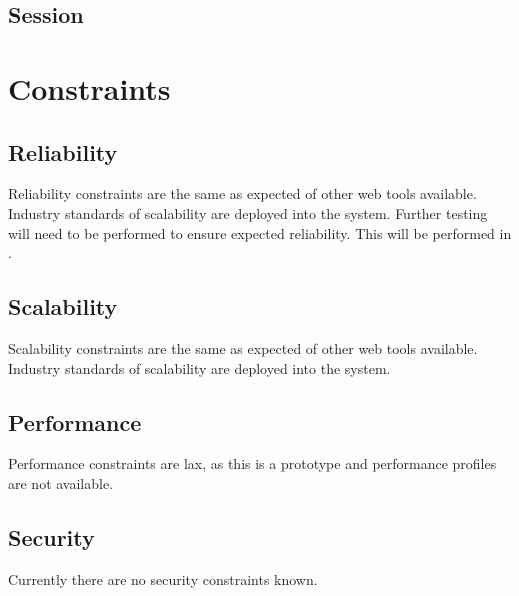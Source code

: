 \documentclass[11pt]{report}
\begin{document}
\subsection{Session}


\section{Constraints}

\subsection{Reliability}

Reliability constraints are the same as expected of other web tools available. Industry standards of scalability are deployed into the system. Further testing will need to be performed to ensure expected reliability. This will be performed in .  

\subsection{Scalability}

Scalability constraints are the same as expected of other web tools available. Industry standards of scalability are deployed into the system. 

\subsection{Performance}

Performance constraints are lax, as this is a prototype and performance profiles are not available. 

\subsection{Security} 

Currently there are no security constraints known. 

{}
\end{document}
